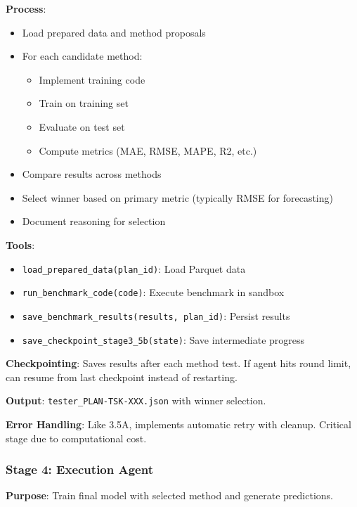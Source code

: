 \documentclass[11pt,a4paper]{article}
\begin{document}
\textbf{Process}:
\begin{itemize}
    \item Load prepared data and method proposals
    \item For each candidate method:
    \begin{itemize}
        \item Implement training code
        \item Train on training set
        \item Evaluate on test set
        \item Compute metrics (MAE, RMSE, MAPE, R2, etc.)
    \end{itemize}
    \item Compare results across methods
    \item Select winner based on primary metric (typically RMSE for forecasting)
    \item Document reasoning for selection
\end{itemize}

\textbf{Tools}:
\begin{itemize}
    \item \texttt{load\_prepared\_data(plan\_id)}: Load Parquet data
    \item \texttt{run\_benchmark\_code(code)}: Execute benchmark in sandbox
    \item \texttt{save\_benchmark\_results(results, plan\_id)}: Persist results
    \item \texttt{save\_checkpoint\_stage3\_5b(state)}: Save intermediate progress
\end{itemize}

\textbf{Checkpointing}: Saves results after each method test. If agent hits round limit, can resume from last checkpoint instead of restarting.

\textbf{Output}: \texttt{tester\_PLAN-TSK-XXX.json} with winner selection.

\textbf{Error Handling}: Like 3.5A, implements automatic retry with cleanup. Critical stage due to computational cost.

\subsubsection{Stage 4: Execution Agent}

\textbf{Purpose}: Train final model with selected method and generate predictions.
\end{document}
